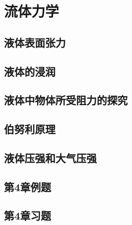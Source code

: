 \section{流体力学}
\subsection{液体表面张力}
\subsection{液体的浸润}
\subsection{液体中物体所受阻力的探究}
\subsection{伯努利原理}
\subsection{液体压强和大气压强} 
\subsection{第4章例题}
\subsection{第4章习题}
